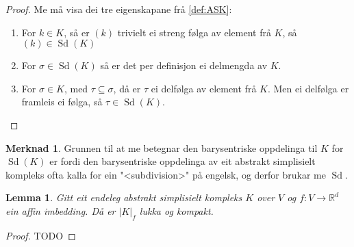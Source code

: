 \documentclass[a4paper, 12pt, norsk]{article}
\theoremstyle{plain}
\newtheorem{lemma}[theorem]{Lemma}
\theoremstyle{definition}
\newtheorem{remark}[theorem]{Merknad}
\newcommand{\Rb}{\mathbb{R}}
\newcommand{\Nb}{\mathbb{N}}
\newcommand{\gr}[1]{ \lvert #1 \rvert } %
\newcommand{\set}[1]{ \left \{ #1 \right \} } %
\newcommand{\tuple}[1]{ \left( #1 \right) } %
\DeclareMathOperator{\Sd}{Sd}
\begin{document}
\begin{proof} \label{thm:subdivisjon-abstrakt-simplisielt-kompleks}
	Me må visa dei tre eigenskapane frå \autoref{def:ASK}:
	\begin{enumerate}
		\item{ For \( k \in K \), så er \( \tuple{k} \) trivielt ei streng følga av element frå \( K \), så \( \tuple{k} \in \Sd(K) \) }
  		\item{ For \( \sigma \in \Sd(K) \) så er det per definisjon ei delmengda av \( K \). }
    	\item{ For \( \sigma \in K \), med \( \tau \subseteq \sigma \), då er \( \tau \) ei delfølga av element frå \( K \). Men ei delfølga er framleis ei følga, så \( \tau \in \Sd(K) \). }  
	\end{enumerate}
\end{proof}

\begin{remark}
	Grunnen til at me betegnar den barysentriske oppdelinga til \( K \) for \( \Sd(K) \) er fordi den barysentriske oppdelinga av eit abstrakt simplisielt kompleks ofta kalla for ein "<subdivision>" på engelsk, og derfor brukar me \( \Sd \).
\end{remark}

\begin{lemma} \label{thm:geometrisk-kompleks-lukka}
	Gitt eit endeleg abstrakt simplisielt kompleks \( K \) over \( V \) og \( f: V \to \Rb^d \) ein affin imbedding. Då er \( \gr{K}_f \) lukka og kompakt.
\end{lemma}

\begin{proof}
	TODO


\end{proof}
\end{document}
